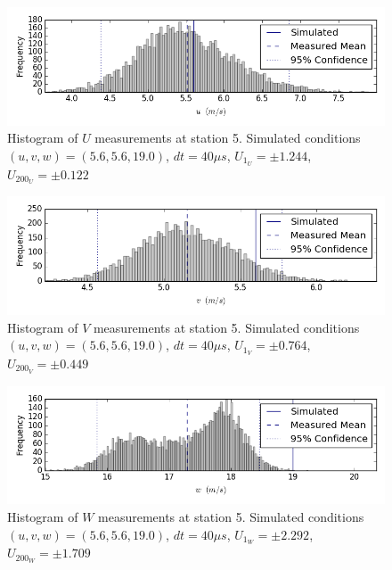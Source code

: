 \begin{figure}[H]
\centering
\includegraphics[width=6in]{figs/Ely_May28th05002/uncertainty_Ely_May28th05002_U}
\caption{Histogram of $U$ measurements at station 5. Simulated conditions $(u,v,w)=(5.6, 5.6, 19.0)$, $dt=40 \mu s$, $U_1_U=\pm 1.244$, $U_200_U=\pm 0.122$}
\label{fig:uncertainty_Ely_May28th05002_U}
\end{figure}


\begin{figure}[H]
\centering
\includegraphics[width=6in]{figs/Ely_May28th05002/uncertainty_Ely_May28th05002_V}
\caption{Histogram of $V$ measurements at station 5. Simulated conditions $(u,v,w)=(5.6, 5.6, 19.0)$, $dt=40 \mu s$, $U_1_V=\pm 0.764$, $U_200_V=\pm 0.449$}
\label{fig:uncertainty_Ely_May28th05002_V}
\end{figure}


\begin{figure}[H]
\centering
\includegraphics[width=6in]{figs/Ely_May28th05002/uncertainty_Ely_May28th05002_W}
\caption{Histogram of $W$ measurements at station 5. Simulated conditions $(u,v,w)=(5.6, 5.6, 19.0)$, $dt=40 \mu s$, $U_1_W=\pm 2.292$, $U_200_W=\pm 1.709$}
\label{fig:uncertainty_Ely_May28th05002_W}
\end{figure}


